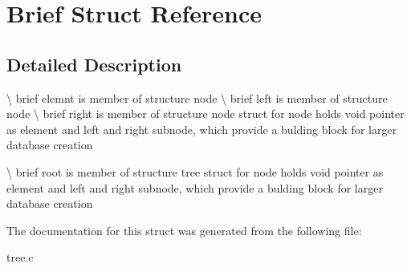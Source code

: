 \hypertarget{structBrief}{}\section{Brief Struct Reference}
\label{structBrief}


\subsection{Detailed Description}
\textbackslash{} brief elemnt is member of structure node \textbackslash{} brief left is member of structure node \textbackslash{} brief right is member of structure node struct for node holds void pointer as element and left and right subnode, which provide a bulding block for larger database creation

\textbackslash{} brief root is member of structure tree struct for node holds void pointer as element and left and right subnode, which provide a bulding block for larger database creation 

The documentation for this struct was generated from the following file\+:\begin{DoxyCompactItemize}
\item 
tree.\+c\end{DoxyCompactItemize}
